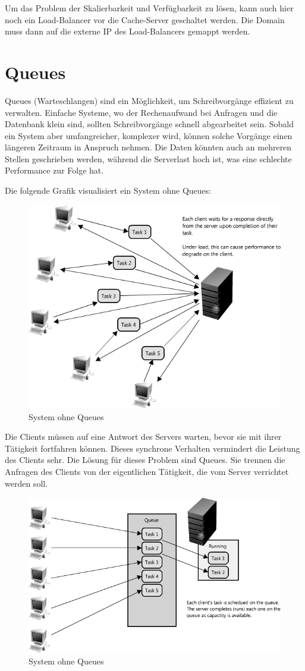 Um das Problem der Skalierbarkeit und Verfügbarkeit zu lösen, kann auch hier noch ein Load-Balancer vor die Cache-Server geschaltet werden. Die Domain muss dann auf die externe IP des Load-Balancers gemappt werden.
\cite{LoadBalancing2}

\section{Queues}
\label{sec:Queues}
Queues (Warteschlangen) sind ein Möglichkeit, um Schreibvorgänge effizient zu verwalten. Einfache Systeme, wo der Rechenaufwand bei Anfragen und die Datenbank klein sind, sollten Schreibvorgänge schnell abgearbeitet sein. Sobald ein System aber umfangreicher, komplexer wird, können solche Vorgänge einen längeren Zeitraum in Anspruch nehmen. Die Daten könnten auch an mehreren Stellen geschrieben werden, während die Serverlast hoch ist, was eine schlechte Performance zur Folge hat.
\cite{Queues}

Die folgende Grafik visualisiert ein System ohne Queues:
\begin{figure}[!ht]
	\begin{center}
		\includegraphics[width=0.5\linewidth]{images/synchronousRequest.png}
		\caption{System ohne Queues \cite{Queues}}
		\label{System_ohne_Queues}
	\end{center}
\end{figure}

Die Clients müssen auf eine Antwort des Servers warten, bevor sie mit ihrer Tätigkeit fortfahren können. Dieses synchrone Verhalten vermindert die Leistung des Clients sehr. Die Lösung für dieses Problem sind Queues. Sie trennen die Anfragen des Clients von der eigentlichen Tätigkeit, die vom Server verrichtet werden soll.

\begin{figure}[!ht]
	\begin{center}
		\includegraphics[width=0.5\linewidth]{images/queues.png}
		\caption{System ohne Queues \cite{Queues}}
		\label{System_mit_Queues}
	\end{center}
\end{figure}

